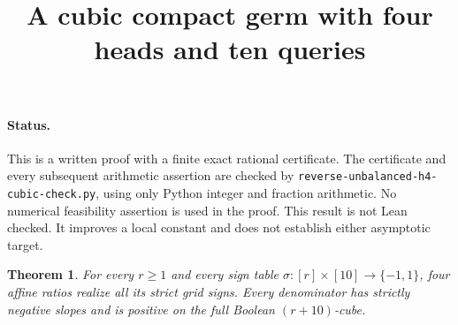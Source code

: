 \documentclass[11pt]{article}
\title{A cubic compact germ with four heads and ten queries}
\author{}
\date{}
\newtheorem{theorem}{Theorem}
\begin{document}
\maketitle

\paragraph{Status.}
This is a written proof with a finite exact rational certificate. The
certificate and every subsequent arithmetic assertion are checked by
\texttt{reverse-unbalanced-h4-cubic-check.py}, using only Python integer
and fraction arithmetic. No numerical feasibility assertion is used in
the proof. This result is not Lean checked. It improves a local constant
and does not establish either asymptotic target.

\begin{theorem}
For every $r\geq1$ and every sign table
$\sigma:[r]\times[10]\to\{-1,1\}$, four affine ratios realize all its
strict grid signs. Every denominator has strictly negative slopes and
is positive on the full Boolean $(r+10)$-cube.
\end{theorem}
\end{document}
